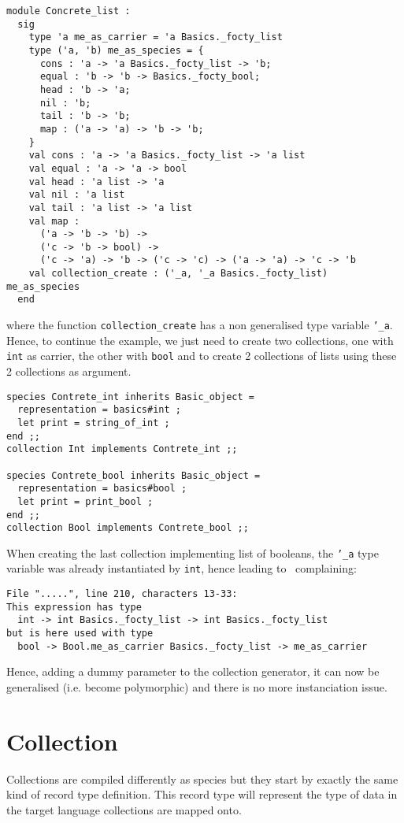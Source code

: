 {\footnotesize
\begin{lstlisting}[language=MyOCaml]
module Concrete_list :
  sig
    type 'a me_as_carrier = 'a Basics._focty_list
    type ('a, 'b) me_as_species = {
      cons : 'a -> 'a Basics._focty_list -> 'b;
      equal : 'b -> 'b -> Basics._focty_bool;
      head : 'b -> 'a;
      nil : 'b;
      tail : 'b -> 'b;
      map : ('a -> 'a) -> 'b -> 'b;
    }
    val cons : 'a -> 'a Basics._focty_list -> 'a list
    val equal : 'a -> 'a -> bool
    val head : 'a list -> 'a
    val nil : 'a list
    val tail : 'a list -> 'a list
    val map :
      ('a -> 'b -> 'b) ->
      ('c -> 'b -> bool) ->
      ('c -> 'a) -> 'b -> ('c -> 'c) -> ('a -> 'a) -> 'c -> 'b
    val collection_create : ('_a, '_a Basics._focty_list) me_as_species
  end
\end{lstlisting}
}
where the function {\tt collection\_create} has a non generalised type
variable {\tt '\_a}. Hence, to continue the example, we just need to
create two collections, one with {\tt int} as carrier, the other with
{\tt bool} and to create 2 collections of lists using these 2 collections
as argument.

{\footnotesize
\begin{lstlisting}
species Contrete_int inherits Basic_object =
  representation = basics#int ;
  let print = string_of_int ;
end ;;
collection Int implements Contrete_int ;;

species Contrete_bool inherits Basic_object =
  representation = basics#bool ;
  let print = print_bool ;
end ;;
collection Bool implements Contrete_bool ;;
\end{lstlisting}
}
When creating the last collection implementing list of booleans, the
{\tt '\_a} type variable was already instantiated by {\tt int}, hence
leading to \ocaml\ complaining:
\begin{verbatim}
File ".....", line 210, characters 13-33:
This expression has type
  int -> int Basics._focty_list -> int Basics._focty_list
but is here used with type
  bool -> Bool.me_as_carrier Basics._focty_list -> me_as_carrier
\end{verbatim}

Hence, adding a dummy parameter to the collection generator, it can
now be generalised (i.e. become polymorphic) and there is no more
instanciation issue.

\section{Collection}
Collections are compiled differently as species but they start by
exactly the same kind of record type definition. This record type will
represent the type of data in the target language collections are
mapped onto.

